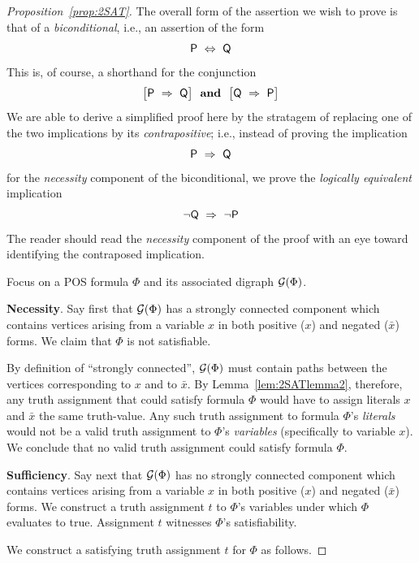 \begin{proof}[Proposition~\ref{prop:2SAT}]
The overall form of the assertion we wish to prove is that of a {\em biconditional}, i.e., an assertion of the form
\[ \mbox{\sf P} \ \Leftrightarrow \ \mbox{\sf Q} \]
This is, of course, a shorthand for the conjunction
\[  \big[ \mbox{\sf P} \ \Rightarrow \ \mbox{\sf Q} \big] \ \ 
\mbox{\bf and} \ \  
\big[ \mbox{\sf Q} \ \Rightarrow \ \mbox{\sf P} \big]
\]
We are able to derive a simplified proof here by the stratagem of replacing one of the two implications by its {\em contrapositive}; i.e., instead of proving the implication
\[ \mbox{\sf P} \ \Rightarrow \ \mbox{\sf Q} \]
for the {\em necessity} component of the biconditional, we prove the {\em logically equivalent} implication
\[  \neg \mbox{\sf Q} \ \Rightarrow \ \neg \mbox{\sf P} \]
The reader should read the {\em necessity} component of the proof with an eye toward identifying the contraposed implication.

\medskip

Focus on a POS formula $\Phi$ and its associated digraph $\mbox{$\cal G$}(\Phi)$.

\medskip

{\bf Necessity}.
Say first that $\mbox{$\cal G$}(\Phi)$ has a strongly connected component which contains vertices arising from a variable $x$ in both positive ($x$) and negated ($\bar{x}$) forms.  We claim that $\Phi$ is not satisfiable.

\smallskip

By definition of ``strongly connected'', $\mbox{$\cal G$}(\Phi)$ must contain paths between the vertices corresponding to $x$ and to $\bar{x}$.  By Lemma~\ref{lem:2SATlemma2}, therefore, any truth assignment that could satisfy formula $\Phi$ would have to assign literals $x$ and $\bar{x}$ the same truth-value.  Any such truth assignment to formula $\Phi$'s {\em literals} would not be a valid truth assignment to $\Phi$'s {\em variables} (specifically to variable $x$).  We conclude that no valid truth assignment could satisfy formula $\Phi$.

\medskip

{\bf Sufficiency}.
Say next that $\mbox{$\cal G$}(\Phi)$ has no strongly connected component which contains vertices arising from a variable $x$ in both positive ($x$) and negated ($\bar{x}$) forms.  We construct a truth assignment $t$ to $\Phi$'s variables under which $\Phi$ evaluates to {\sc true}.  Assignment $t$ witnesses $\Phi$'s satisfiability.

\smallskip

We construct a satisfying truth assignment $t$ for $\Phi$ as follows.


\end{proof}
